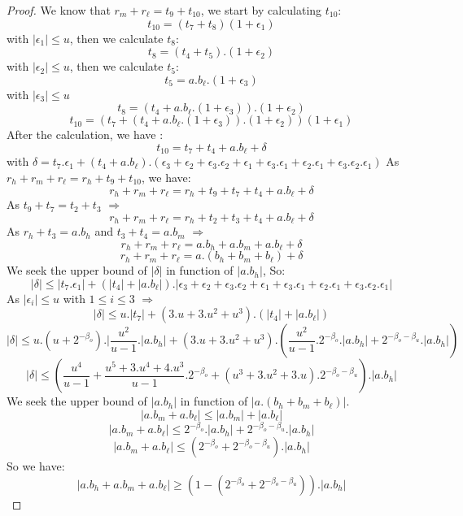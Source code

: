 \begin{proof}
We know that $r_m + r_{\ell} = t_9 + t_{10}$, we start by calculating $ t_{10}$:
$$t_{10} = (t_7 + t_8)(1+\epsilon_1)$$
with $\lvert \epsilon_1 \rvert \le u$, then we calculate $t_8 $:
$$t_8 = (t_4 + t_5).(1+\epsilon_2)$$
with $\lvert \epsilon_2 \rvert \le u$, then we calculate $t_5 $:
$$t_5 = a.b_{\ell}.(1+\epsilon_3)$$
with $\lvert \epsilon_3 \rvert \le u$
$$t_8 = (t_4 + a.b_{\ell}.(1+\epsilon_3)).(1+\epsilon_2)$$
$$t_{10} = (t_7 + (t_4 + a.b_{\ell}.(1+\epsilon_3)).(1+\epsilon_2))(1+\epsilon_1)$$
After the calculation, we have :
$$t_{10} = t_7 + t_4 + a.b_{\ell} + \delta$$
with $\delta = t_7.\epsilon_1 + (t_4+ a.b_{\ell}).(\epsilon_3 + \epsilon_2 +\epsilon_3.\epsilon_2 + \epsilon_1 + \epsilon_3.\epsilon_1 + \epsilon_2.\epsilon_1 + \epsilon_3.\epsilon_2.\epsilon_1)$
As $r_h + r_m + r_{\ell} = r_h + t_9 + t_{10}$, we have:
$$r_h + r_m + r_{\ell} = r_h + t_9 + t_7 + t_4 + a.b_{\ell} + \delta$$
As $t_9 + t_7 = t_2 + t_3$ $\Rightarrow$
$$r_h + r_m + r_{\ell} = r_h + t_2 + t_3 + t_4 + a.b_{\ell} + \delta$$
As $r_h + t_3 = a.b_h$ and $t_3 + t_4 = a.b_m$ $\Rightarrow$
$$r_h + r_m + r_{\ell} = a.b_h + a.b_m + a.b_{\ell} + \delta$$
$$r_h + r_m + r_{\ell} = a.(b_h + b_m + b_{\ell}) + \delta$$
We seek the upper bound of $\lvert \delta \rvert $ in function of $\lvert a.b_h \rvert$, So:
$$\lvert \delta \rvert \le \lvert t_7.\epsilon_1\rvert + (\lvert t_4 \rvert + \lvert a.b_{\ell} \rvert ). \lvert \epsilon_3 + \epsilon_2 +\epsilon_3.\epsilon_2 + \epsilon_1 + \epsilon_3.\epsilon_1 + \epsilon_2.\epsilon_1 + \epsilon_3.\epsilon_2.\epsilon_1 \rvert$$
As $\lvert \epsilon_i \rvert \le u$ with $1 \le i \le 3$ $\Rightarrow$
$$\lvert \delta \rvert \le u.\lvert t_7\rvert + (3.u + 3.u^2 +u^3).(\lvert t_4 \rvert + \lvert a.b_{\ell} \rvert ) $$
$$\lvert \delta \rvert \le u.(u  + 2^{-\beta_o}).\lvert \frac{u^2}{u-1}. \lvert a.b_h \rvert + (3.u + 3.u^2 +u^3).(\frac{u^2}{u-1}.2^{-\beta_o}.\lvert a.b_h \rvert + 2^{-\beta_o -\beta_u}.\lvert a.b_h \rvert ) $$
$$\lvert \delta \rvert \le (\frac{u^4}{u-1} + \frac{u^5+3.u^4+4.u^3}{u-1}.2^{-\beta_o} + (u^3+3.u^2+3.u).2^{-\beta_o - \beta_u}).\lvert a.b_h \rvert $$
We seek the upper bound of $\lvert a.b_h \rvert$ in function of $\lvert a.(b_h+b_m+b_{\ell})\rvert$.
$$\lvert a.b_m + a.b_{\ell} \rvert \le \lvert a.b_m \rvert +  \lvert a.b_{\ell} \rvert$$
$$\lvert a.b_m + a.b_{\ell} \rvert \le 2^{-\beta_o}.\lvert a.b_h \rvert +  2^{-\beta_o -\beta_u}.\lvert a.b_h \rvert$$
$$\lvert a.b_m + a.b_{\ell} \rvert \le (2^{-\beta_o} +  2^{-\beta_o -\beta_u}).\lvert a.b_h \rvert$$
So we have:
$$\lvert a.b_h +a.b_m + a.b_{\ell} \rvert \ge (1-(2^{-\beta_o} +  2^{-\beta_o -\beta_u})).\lvert a.b_h \rvert$$

\end{proof}
